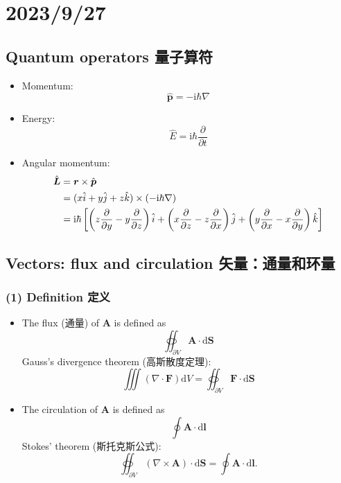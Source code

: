\chapter{2023/9/27}\label{20230927}

\section{Quantum operators
量子算符}\label{quantum-operators-ux91cfux5b50ux7b97ux7b26}

\begin{itemize}
\tightlist{}
\item
  Momentum: \[\hat {\boldsymbol p} = - \mathrm i \hbar \nabla \]
\item
  Energy: \[\hat E = \mathrm i \hbar \dfrac{\partial}{\partial t} \]
\item
  Angular momentum: \begin{align*}
    \hat {\boldsymbol L} & = \boldsymbol r \times \hat {\boldsymbol p} \\ 
    & = (x \hat i + y \hat j + z \hat k) \times(- \mathrm i \hbar \nabla) \\
    & = \mathrm i \hbar\left[\left(z {\partial \over \partial y} - y {\partial \over \partial z} \right)\hat i + \left(x {\partial \over \partial z} - z {\partial \over \partial x} \right) \hat j + \left(y {\partial \over \partial x} - x {\partial \over \partial y} \right) \hat k \right]
    \end{align*}
\end{itemize}

\section{Vectors: flux and circulation
矢量：通量和环量}\label{vectors-flux-and-circulation-ux77e2ux91cfux901aux91cfux548cux73afux91cf}

\subsection*{(1) Definition 定义}\label{definition-ux5b9aux4e49}

\begin{itemize}
\tightlist{}
\item
  The flux (通量) of \(\boldsymbol A\) is defined as
  \[ \oiint_{\partial V} \boldsymbol A \cdot \mathrm d \boldsymbol S\]
  Gauss's divergence theorem (高斯散度定理):
  \[\iiint (\nabla \cdot \boldsymbol F) \mathrm dV = \oiint_{\partial V} \boldsymbol F \cdot \mathrm d \boldsymbol S\]
\item
  The circulation of \(\boldsymbol A\) is defined as
  \[\oint \boldsymbol A \cdot \mathrm d \boldsymbol l\] Stokes' theorem (斯托克斯公式):
  \[\oiint_{\partial V} (\nabla \times \boldsymbol A) \cdot \mathrm d \boldsymbol S = \oint \boldsymbol A \cdot \mathrm d \boldsymbol l.\]
\end{itemize}

